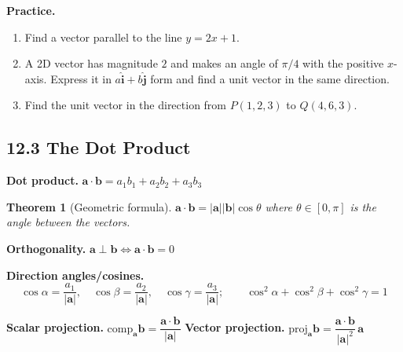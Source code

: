 \documentclass[12pt]{article}
\theoremstyle{compact}
\newtheorem{thm}{Theorem}[section]
\renewcommand{\vec}[1]{\mathbf{#1}}
\newcommand{\ihat}{\hat{\mathbf{i}}}
\newcommand{\jhat}{\hat{\mathbf{j}}}
\begin{document}
\medskip\textbf{Practice.}
\begin{enumerate}[noitemsep]
  \item Find a vector parallel to the line $y=2x+1$.
  \item A 2D vector has magnitude $2$ and makes an angle of $\pi/4$ with the positive $x$-axis. Express it in $a\ihat+b\jhat$ form and find a unit vector in the same direction.
  \item Find the unit vector in the direction from $P(1,2,3)$ to $Q(4,6,3)$.
\end{enumerate}

\subsection{12.3 The Dot Product}

\textbf{Dot product.} $\vec{a}\cdot\vec{b} = a_1b_1+a_2b_2+a_3b_3$

\begin{thm}[Geometric formula]
$\vec{a}\cdot\vec{b} = |\vec{a}||\vec{b}|\cos\theta$ where $\theta\in[0,\pi]$ is the angle between the vectors.
\end{thm}

\textbf{Orthogonality.} $\vec{a}\perp\vec{b} \iff \vec{a}\cdot\vec{b}=0$

\textbf{Direction angles/cosines.}
\[
\cos\alpha = \frac{a_1}{|\vec{a}|},\quad \cos\beta = \frac{a_2}{|\vec{a}|},\quad \cos\gamma = \frac{a_3}{|\vec{a}|}; \qquad \cos^2\alpha+\cos^2\beta+\cos^2\gamma=1
\]

\textbf{Scalar projection.} $\text{comp}_{\vec{a}}\vec{b} = \dfrac{\vec{a}\cdot\vec{b}}{|\vec{a}|}$ \qquad
\textbf{Vector projection.} $\text{proj}_{\vec{a}}\vec{b} = \dfrac{\vec{a}\cdot\vec{b}}{|\vec{a}|^2}\,\vec{a}$

\begin{center}
\end{center}
\end{document}
